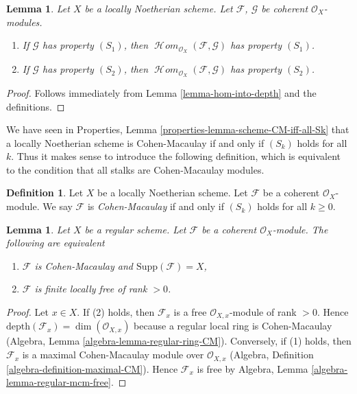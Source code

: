 \documentclass{stacks-project}
\theoremstyle{plain}
\newtheorem{lemma}[subsection]{Lemma}
\theoremstyle{definition}
\newtheorem{definition}[subsection]{Definition}
\theoremstyle{remark}
\numberwithin{equation}{subsection}
\def\SheafHom{\mathop{\mathcal{H}\!\mathit{om}}\nolimits}
\begin{document}
\begin{lemma}
\label{lemma-hom-into-S2}
Let $X$ be a locally Noetherian scheme. Let $\mathcal{F}$, $\mathcal{G}$
be coherent $\mathcal{O}_X$-modules.
\begin{enumerate}
\item If $\mathcal{G}$ has property $(S_1)$, then
$\SheafHom_{\mathcal{O}_X}(\mathcal{F}, \mathcal{G})$ has property $(S_1)$.
\item If $\mathcal{G}$ has property $(S_2)$, then
$\SheafHom_{\mathcal{O}_X}(\mathcal{F}, \mathcal{G})$ has property $(S_2)$.
\end{enumerate}
\end{lemma}

\begin{proof}
Follows immediately from Lemma \ref{lemma-hom-into-depth}
and the definitions.
\end{proof}

\noindent
We have seen in Properties, Lemma \ref{properties-lemma-scheme-CM-iff-all-Sk}
that a locally Noetherian
scheme is Cohen-Macaulay if and only if $(S_k)$ holds for all $k$.
Thus it makes sense to introduce the following definition, which
is equivalent to the condition that all stalks are Cohen-Macaulay modules.

\begin{definition}
\label{definition-Cohen-Macaulay}
Let $X$ be a locally Noetherian scheme.
Let $\mathcal{F}$ be a coherent $\mathcal{O}_X$-module.
We say $\mathcal{F}$ is {\it Cohen-Macaulay} if and only
if $(S_k)$ holds for all $k \geq 0$.
\end{definition}

\begin{lemma}
\label{lemma-Cohen-Macaulay-over-regular}
Let $X$ be a regular scheme. Let $\mathcal{F}$ be a coherent
$\mathcal{O}_X$-module. The following are equivalent
\begin{enumerate}
\item $\mathcal{F}$ is Cohen-Macaulay and $\text{Supp}(\mathcal{F}) = X$,
\item $\mathcal{F}$ is finite locally free of rank $> 0$.
\end{enumerate}
\end{lemma}

\begin{proof}
Let $x \in X$. If (2) holds, then $\mathcal{F}_x$ is a free
$\mathcal{O}_{X, x}$-module of rank $> 0$. Hence
$\text{depth}(\mathcal{F}_x) = \dim(\mathcal{O}_{X, x})$
because a regular local ring is Cohen-Macaulay
(Algebra, Lemma \ref{algebra-lemma-regular-ring-CM}).
Conversely, if (1) holds, then $\mathcal{F}_x$ is a
maximal Cohen-Macaulay module over $\mathcal{O}_{X, x}$
(Algebra, Definition \ref{algebra-definition-maximal-CM}).
Hence $\mathcal{F}_x$ is free by
Algebra, Lemma \ref{algebra-lemma-regular-mcm-free}.
\end{proof}
\end{document}
